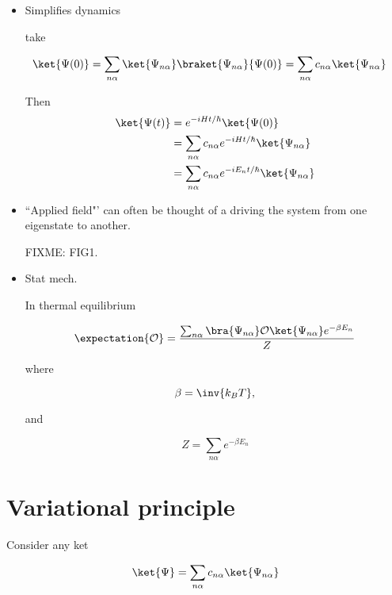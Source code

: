 \begin{itemize}
\item Simplifies dynamics

take

\begin{align*}
\ket{\Psi(0)}
= \sum_{n\alpha}
\ket{\Psi_{n \alpha}}
\braket{\Psi_{n \alpha}}{\Psi(0)}
&
= \sum_{n\alpha} c_{n \alpha} \ket{\Psi_{n \alpha}}
\end{align*}

Then
\begin{align*}
\ket{\Psi(t)}
&=
e^{-i H t/\hbar}
\ket{\Psi(0)} \\
&=
\sum_{n\alpha} c_{n \alpha}
e^{-i H t/\hbar}
\ket{\Psi_{n \alpha}}  \\
&=
\sum_{n\alpha} c_{n \alpha}
e^{-i E_n t/\hbar}
\ket{\Psi_{n \alpha}}
\end{align*}

\item ``Applied  field"' can often be thought of a driving the system from one eigenstate to another.

FIXME: FIG1.

\item Stat mech.

In thermal equilibrium

\begin{equation}\label{eqn:qmTwoL2:30}
\expectation{\mathcal{O}} =
\frac{\sum_{n \alpha} \bra{\Psi_{n\alpha}} \mathcal{O} \ket{\Psi_{n \alpha}}  e^{-\beta E_n}}{
Z
}
\end{equation}

where

\begin{equation}\label{eqn:qmTwoL2:50}
\beta = \inv{k_B T},
\end{equation}

and

\begin{equation}\label{eqn:qmTwoL2:70}
Z = \sum_{n \alpha} e^{-\beta E_n}
\end{equation}
\end{itemize}

\section{Variational principle}

Consider any ket

\begin{equation}\label{eqn:qmTwoL2:90}
\ket{\Psi} = \sum_{n \alpha} c_{n \alpha} \ket{\Psi_{n \alpha}}
\end{equation}

